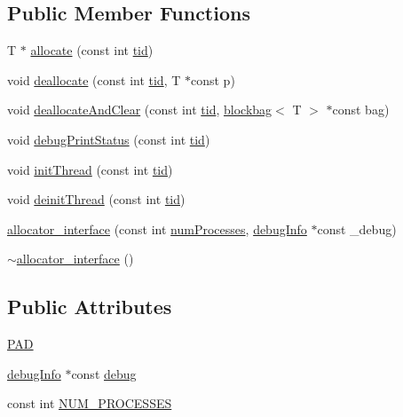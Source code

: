 \subsection*{Public Member Functions}
\begin{DoxyCompactItemize}
\item 
T $\ast$ \hyperlink{classallocator__interface_a3694fb05c3cf5edaea1675c90de6a435}{allocate} (const int \hyperlink{microbench_2main_8cpp_a9ca9869868fe7e7a38a921cc7de4103f}{tid})
\item 
void \hyperlink{classallocator__interface_a608c7d3ca4735cc0a0c7d200a7e641f5}{deallocate} (const int \hyperlink{microbench_2main_8cpp_a9ca9869868fe7e7a38a921cc7de4103f}{tid}, T $\ast$const p)
\item 
void \hyperlink{classallocator__interface_ac6142b4f4c077e7dd3e2ef73fd9f8cc9}{deallocate\+And\+Clear} (const int \hyperlink{microbench_2main_8cpp_a9ca9869868fe7e7a38a921cc7de4103f}{tid}, \hyperlink{classblockbag}{blockbag}$<$ T $>$ $\ast$const bag)
\item 
void \hyperlink{classallocator__interface_afce134aab048a2003beb1fb85e4a7562}{debug\+Print\+Status} (const int \hyperlink{microbench_2main_8cpp_a9ca9869868fe7e7a38a921cc7de4103f}{tid})
\item 
void \hyperlink{classallocator__interface_a38578a36ba1ff2903563ef757bdb7160}{init\+Thread} (const int \hyperlink{microbench_2main_8cpp_a9ca9869868fe7e7a38a921cc7de4103f}{tid})
\item 
void \hyperlink{classallocator__interface_a328cf20126c294a1e7ca7775a3ad401a}{deinit\+Thread} (const int \hyperlink{microbench_2main_8cpp_a9ca9869868fe7e7a38a921cc7de4103f}{tid})
\item 
\hyperlink{classallocator__interface_a644535371130ddfa03b9c31826697dbd}{allocator\+\_\+interface} (const int \hyperlink{testing_8cpp_aa085812188e21ede75351d88b9b2c30d}{num\+Processes}, \hyperlink{classdebugInfo}{debug\+Info} $\ast$const \+\_\+debug)
\item 
\hyperlink{classallocator__interface_a8124a05dc7a241ec2fc6e4292e0636d1}{$\sim$allocator\+\_\+interface} ()
\end{DoxyCompactItemize}
\subsection*{Public Attributes}
\begin{DoxyCompactItemize}
\item 
\hyperlink{classallocator__interface_adb492ef9e40efcb500c83d93a5efe6cf}{P\+AD}
\item 
\hyperlink{classdebugInfo}{debug\+Info} $\ast$const \hyperlink{classallocator__interface_a2985caeff7ccb32343502ff0c0f86c60}{debug}
\item 
const int \hyperlink{classallocator__interface_a114bb276931256b53b2e5cf1308c350f}{N\+U\+M\+\_\+\+P\+R\+O\+C\+E\+S\+S\+ES}
\end{DoxyCompactItemize}


